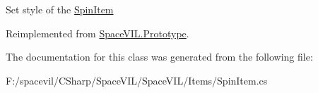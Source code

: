 Set style of the \mbox{\hyperlink{class_space_v_i_l_1_1_spin_item}{Spin\+Item}} 



Reimplemented from \mbox{\hyperlink{class_space_v_i_l_1_1_prototype_ae96644a6ace490afb376fb542161e541}{Space\+V\+I\+L.\+Prototype}}.



The documentation for this class was generated from the following file\+:\begin{DoxyCompactItemize}
\item 
F\+:/spacevil/\+C\+Sharp/\+Space\+V\+I\+L/\+Space\+V\+I\+L/\+Items/Spin\+Item.\+cs\end{DoxyCompactItemize}
